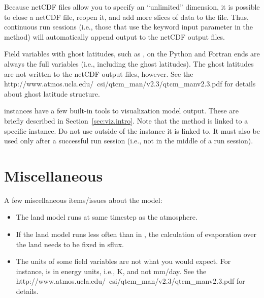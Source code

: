 Because netCDF files allow you to specify an ``unlimited'' dimension,
it is possible to close a netCDF file, reopen it, and add more
slices of data to the file.  Thus, continuous  run
sessions (i.e., those that use the  keyword input parameter
in the  method) will automatically append output
to the netCDF output files.

Field variables with ghost latitudes, such as , on the
Python and Fortran ends are always the full variables (i.e., including
the ghost latitudes).  The ghost latitudes are not written to the
netCDF output files, however.
See the %
{%
        {http://www.atmos.ucla.edu/~csi/qtcm_man/v2.3/qtcm_manv2.3.pdf}}
	\cite{Neelin/etal:2002}
for details about ghost latitude structure.

 instances have a few built-in tools to visualization
model output.  These are briefly described in Section~\ref{sec:viz.intro}.
Note that the  method is linked to a specific 
instance.  Do not use  outside of the instance it is
linked to.  It must also be used only after a successful run session
(i.e., not in the middle of a run session).




\section{Miscellaneous}

A few miscellaneous items/issues about the model:
\begin{itemize}
\item The land model runs at same timestep as the atmosphere.

\item If the land model runs less often than 
	 in , 
	the calculation of evaporation over the land 
	needs to be fixed in sflux.

\item The units of some field variables are not what you would expect.
	For instance,  is in energy units, i.e., K, and not
	mm/day.
	See the
{%
        {http://www.atmos.ucla.edu/~csi/qtcm_man/v2.3/qtcm_manv2.3.pdf}}
	\cite{Neelin/etal:2002}
	for details.
\end{itemize}




